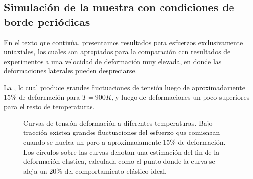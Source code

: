 \subsection{Simulación de la muestra con condiciones de borde periódicas}
\label{S3_3_1}

En el texto que continúa, presentamos resultados para esfuerzos exclusivamente uniaxiales, los cuales son apropiados para la comparación con resultados de experimentos a una velocidad de deformación muy elevada, en donde las deformaciones laterales pueden despreciarse. 

La     , lo cual produce grandes fluctuaciones de tensión luego de aproximadamente 15\% de deformación para $T=900K$, y luego de deformaciones un poco superiores para el resto de temperaturas.


\begin{figure}[htp]
\centering
{}
\caption[Curvas de tensión-deformación a diferentes temperaturas]{Curvas de tensión-deformación a diferentes temperaturas. Bajo tracción existen grandes fluctuaciones del esfuerzo que comienzan cuando se nuclea un poro a aproximadamente 15\% de deformación. Los círculos sobre las curvas denotan una estimación del fin de la deformación elástica, calculada como el punto donde la curva se aleja un 20\% del comportamiento elástico ideal.}
\label{C3:fg:sStrain}
\end{figure}

